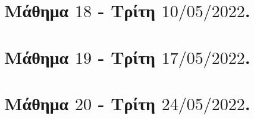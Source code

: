 \documentclass[oneside,a4paper]{article}
\begin{document}
\pagebreak

\section*{Μάθημα $18$ - Τρίτη $10/05/2022$.}
\vspace{0.3truecm}


\pagebreak

\section*{Μάθημα $19$ - Τρίτη $17/05/2022$.}
\vspace{0.3truecm}


\pagebreak

\section*{Μάθημα $20$ - Τρίτη $24/05/2022$.}
\vspace{0.3truecm}


\pagebreak
\end{document}
